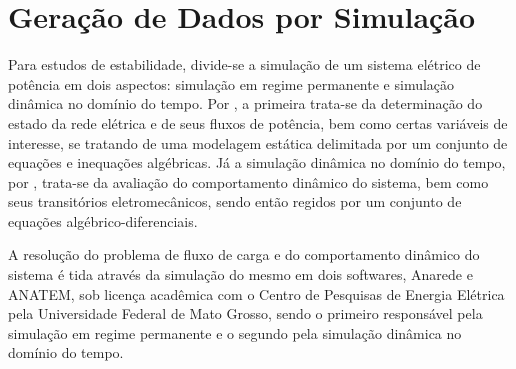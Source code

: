 \documentclass[12pt,oneside,a4paper,chapter=TITLE,section=TITLE,sumario=tradicional,english,brazil]{abntex2}
\begin{document}
\section{Geração de Dados por Simulação}
Para estudos de estabilidade, divide-se a simulação de um sistema elétrico de potência em dois aspectos: simulação em regime permanente e simulação dinâmica no domínio do tempo. Por \textcite{monticelli1983}, a primeira trata-se da determinação do estado da rede elétrica e de seus fluxos de potência, bem como certas variáveis de interesse, se tratando de uma modelagem estática delimitada por um conjunto de equações e inequações algébricas. Já a simulação dinâmica no domínio do tempo, por \textcite{kundur1994}, trata-se da avaliação do comportamento dinâmico do sistema, bem como seus transitórios eletromecânicos, sendo então regidos por um conjunto de equações algébrico-diferenciais.\par
A resolução do problema de fluxo de carga e do comportamento dinâmico do sistema é tida através da simulação do mesmo em dois softwares, Anarede e ANATEM, sob licença acadêmica com o Centro de Pesquisas de Energia Elétrica pela Universidade Federal de Mato Grosso, sendo o primeiro responsável pela simulação em regime permanente e o segundo pela simulação dinâmica no domínio do tempo.\par 
\end{document}
